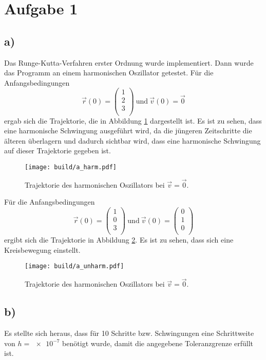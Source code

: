 \section*{Aufgabe 1}
\subsection*{a)}
Das Runge-Kutta-Verfahren erster Ordnung wurde implementiert. Dann wurde das
Programm an einem harmonischen Oszillator getestet.
Für die Anfangsbedingungen
\begin{equation*}
  \vec{r}(0) = \begin{pmatrix}
  1 \\ 2 \\ 3 \\
\end{pmatrix} \ \text{und} \
\vec{v}(0) = \vec{0}
\end{equation*}
ergab sich die Trajektorie, die in Abbildung \ref{fig:harm} dargestellt ist. Es
ist zu sehen, dass eine harmonische Schwingung ausgeführt wird, da die jüngeren
Zeitschritte die älteren überlagern und dadurch sichtbar wird, dass eine
harmonische Schwingung auf dieser Trajektorie gegeben ist.

\begin{figure}
  \centering
  \texttt{[image: build/a\_harm.pdf]}
  \caption{Trajektorie des harmonischen Oszillators bei $\vec{v} = \vec{0}$.}
  \label{fig:harm}
\end{figure}

Für die Anfangsbedingungen
\begin{equation*}
  \vec{r}(0) = \begin{pmatrix}
  1 \\ 0 \\ 3 \\
\end{pmatrix} \ \text{und} \
\vec{v}(0) = \begin{pmatrix}
  0 \\ 1 \\ 0 \\
\end{pmatrix}
\end{equation*}
ergibt sich die Trajektorie in Abbildung \ref{fig:unharm}. Es ist zu sehen, dass
sich eine Kreisbewegung einstellt.

\begin{figure}
  \centering
  \texttt{[image: build/a\_unharm.pdf]}
  \caption{Trajektorie des harmonischen Oszillators bei $\vec{v} = \vec{0}$.}
  \label{fig:unharm}
\end{figure}

\subsection*{b)}
Es stellte sich heraus, dass für 10 Schritte bzw. Schwingungen eine Schrittweite
von $h = \num{e-7}$ benötigt wurde, damit die angegebene Toleranzgrenze erfüllt
ist.
